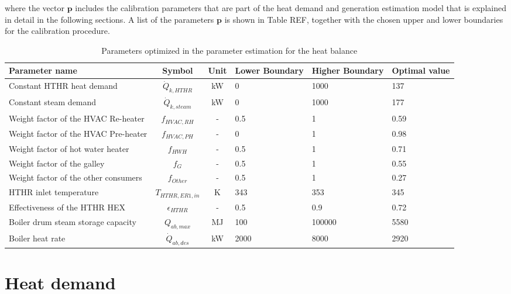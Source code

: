 \documentclass[]{article}
\begin{document}
where the vector $\textbf{p}$ includes the calibration parameters that are part of the heat demand and generation estimation model that is explained in detail in the following sections. A list of the parameters $\textbf{p}$ is shown in Table REF, together with the chosen upper and lower boundaries for the calibration procedure.
\begin{table}
	\centering
	\begin{tabular}{p{3cm}ccp{1.6cm}p{1.6cm}p{1.2cm}}
		\hline 
		Parameter name & Symbol  & Unit & Lower Boundary & Higher Boundary & Optimal value \\ 
		\hline
		Constant HTHR heat demand	 & $\dot{Q}_{k,HTHR}$ & kW & 0 & 1000 & 137 \\ 
		Constant steam demand		 & $\dot{Q}_{k,steam}$ & kW & 0 & 1000 & 177 \\
		Weight factor of the HVAC Re-heater & $f_{HVAC,RH}$ & - & 0.5 & 1 & 0.59 \\ 
		Weight factor of the HVAC Pre-heater & $f_{HVAC,PH}$ & - & 0 & 1 & 0.98 \\ 
		Weight factor of hot water heater & $f_{HWH}$ & - & 0.5 & 1 & 0.71 \\ 
		Weight factor of the galley & $f_{G}$ & - & 0.5 & 1 & 0.55 \\ 
		Weight factor of the other consumers & $f_{Other}$ & - & 0.5 & 1 & 0.27 \\ 
		HTHR inlet temperature & $T_{HTHR,ER1,in}$ & K & 343 & 353 & 345 \\
		Effectiveness of the HTHR HEX & $\epsilon_{HTHR} $ & - & 0.5 & 0.9 & 0.72 \\
		Boiler drum steam storage capacity & $Q_{ab,max}$ & MJ & 100 & 100000 & 5580 \\ 
		Boiler heat rate & $\dot{Q}_{ab,des}$ & kW & 2000 & 8000 & 2920 \\ 
		\hline
	\end{tabular}
	\caption{Parameters optimized in the parameter estimation for the heat balance}
	\label{tab:ParameterEstimation} 
\end{table}



\section{Heat demand}
\end{document}
